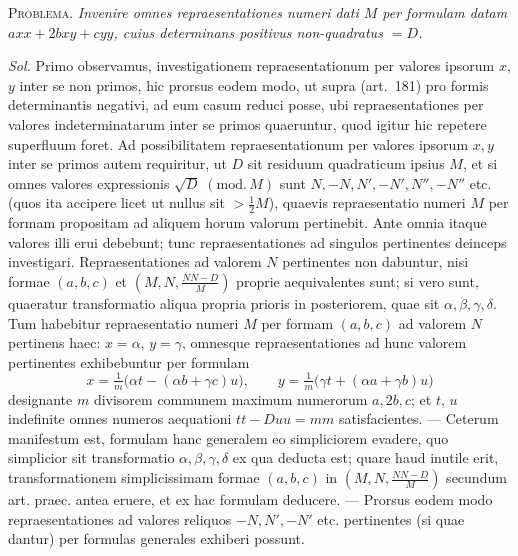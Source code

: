 \textsc{Problema.} \textit{Invenire omnes repraesentationes numeri dati $M$ per formulam datam $axx+2bxy+cyy$, cuius determinans positivus non-quadratus $=D$.}

\textit{Sol.} Primo observamus, investigationem repraesentationum per valores ipsorum $x$, $y$ inter se non primos, hic prorsus eodem modo, ut supra (art.~181) pro formis determinantis negativi, ad eum casum reduci posse, ubi repraesentationes per valores indeterminatarum inter se primos quaeruntur, quod igitur hic repetere superfluum foret. Ad possibilitatem repraesentationum per valores ipsorum $x,y$ inter se primos autem requiritur, ut $D$ sit residuum quadraticum ipsius $M$, et si omnes valores expressionis $\sqrt D\;(\mathrm{mod.}\,M)$ sunt $N,-N,N',-N',N'',-N''$ etc. (quos ita accipere licet ut nullus sit $>\tfrac12M$), quaevis repraesentatio numeri $M$ per formam propositam ad aliquem horum valorum pertinebit. Ante omnia itaque valores illi erui debebunt; tunc repraesentationes ad singulos pertinentes deinceps investigari. Repraesentationes ad valorem $N$ pertinentes non dabuntur, nisi formae $(a,b,c)$ et $(M,N,\frac{NN-D}{M})$ proprie aequivalentes sunt; si vero sunt, quaeratur transformatio aliqua propria prioris in posteriorem, quae sit $\alpha,\beta,\gamma,\delta$. Tum habebitur repraesentatio numeri $M$ per formam $(a,b,c)$ ad valorem $N$ pertinens haec: $x=\alpha$, $y=\gamma$, omnesque repraesentationes ad hunc valorem pertinentes exhibebuntur per formulam
\[
x=\tfrac1m\bigl(\alpha t-(\alpha b+\gamma c)u\bigr),\qquad
y=\tfrac1m\bigl(\gamma t+(\alpha a+\gamma b)u\bigr)
\]
designante $m$ divisorem communem maximum numerorum $a,2b,c$; et $t$, $u$ indefinite omnes numeros aequationi $tt-Duu=mm$ satisfacientes. --- Ceterum manifestum est, formulam hanc generalem eo simpliciorem evadere, quo simplicior sit transformatio $\alpha,\beta,\gamma,\delta$ ex qua deducta est; quare haud inutile erit, transformationem simplicissimam formae $(a,b,c)$ in $(M,N,\frac{NN-D}{M})$ secundum art. praec. antea eruere, et ex hac formulam deducere. --- Prorsus eodem modo repraesentationes ad valores reliquos $-N,N',-N'$ etc. pertinentes (si quae dantur) per formulas generales exhiberi possunt.

